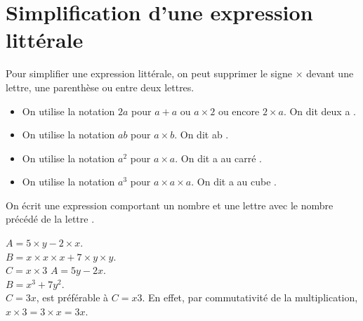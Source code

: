 \medskip


\section{Simplification d'une expression littérale}

Pour simplifier une expression littérale, on peut supprimer le signe \og $\times$ \fg{} devant une lettre, une parenthèse ou entre deux lettres. 

\begin{propriete}
   \begin{itemize}
      \item On utilise la notation $2a$ pour $a+a$ ou $a\times2$ ou encore $2\times a$. On dit \og deux a \fg.
      \item On utilise la notation $ab$ pour $a\times b$. On dit \og ab \fg.
      \item On utilise la notation $a^2$ pour $a\times a$. On dit \og a au carré \fg.
      \item On utilise la notation $a^3$ pour $a\times a\times a$. On dit \og a au cube \fg. \\ [-8mm]
   \end{itemize}
\end{propriete}

\bigskip

On écrit une expression comportant un nombre et une \og lettre \fg{} avec le nombre précédé de la \og lettre \fg.

\begin{exemple}[0.5]
   $A =5\times y-2\times x$. \\
   $B =x\times x \times x + 7\times y\times y$. \\
   $C =x\times3$
   \correction
      $A =5y-2x$. \\
      $B =x^3+7y^2$. \\
      $C =3x$, est préférable à $C=x3$. En effet, par commutativité de la multiplication, $x\times3 =3\times x =3x$.
\end{exemple}


\exercicesbase

